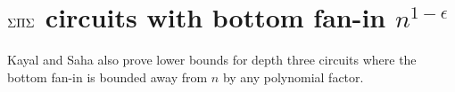 \section{$\Sigma\Pi\Sigma$ circuits with bottom fan-in $n^{1-\epsilon}$}

Kayal and Saha \cite{KayalSaha14} also prove lower bounds for depth three circuits
where the bottom fan-in is bounded away from $n$ by any polynomial factor. \\






